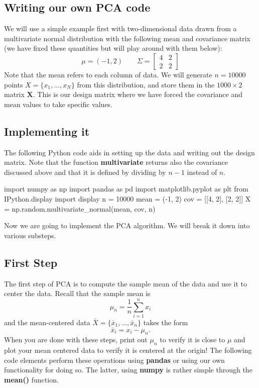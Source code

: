 \documentclass[%
oneside,                 %
final,                   %
10pt]{article}
\begin{document}
\noindent
\subsection{Writing our own PCA code}

We will use a simple example first with two-dimensional data
drawn from a multivariate normal distribution with the following mean and covariance matrix (we have fixed these quantities but will play around with them below):
\[
\mu = (-1,2) \qquad \Sigma = \begin{bmatrix} 4 & 2 \\
2 & 2
\end{bmatrix}
\]
Note that the mean refers to each column of data. 
We will generate $n = 10000$ points $X = \{ x_1, \ldots, x_N \}$ from
this distribution, and store them in the $1000 \times 2$ matrix $\bm{X}$. This is our design matrix where we have forced the covariance and mean values to take specific values.

\subsection{Implementing it}
The following Python code aids in setting up the data and writing out the design matrix.
Note that the function \textbf{multivariate} returns also the covariance discussed above and that it is defined by dividing by $n-1$ instead of $n$.









\bpycod
import numpy as np
import pandas as pd
import matplotlib.pyplot as plt
from IPython.display import display
n = 10000
mean = (-1, 2)
cov = [[4, 2], [2, 2]]
X = np.random.multivariate_normal(mean, cov, n)

\epycod


Now we are going to implement the PCA algorithm. We will break it down into various substeps.

\subsection{First Step}

The first step of PCA is to compute the sample mean of the data and use it to center the data. Recall that the sample mean is
\[
\mu_n = \frac{1}{n} \sum_{i=1}^n x_i
\]
and the mean-centered data $\bar{X} = \{ \bar{x}_1, \ldots, \bar{x}_n \}$ takes the form
\[
\bar{x}_i = x_i - \mu_n.
\]
When you are done with these steps, print out $\mu_n$ to verify it is
close to $\mu$ and plot your mean centered data to verify it is
centered at the origin! 
The following code elements perform these operations using \textbf{pandas} or using our own functionality for doing so. The latter, using \textbf{numpy} is rather simple through the \textbf{mean()} function. 
\end{document}
